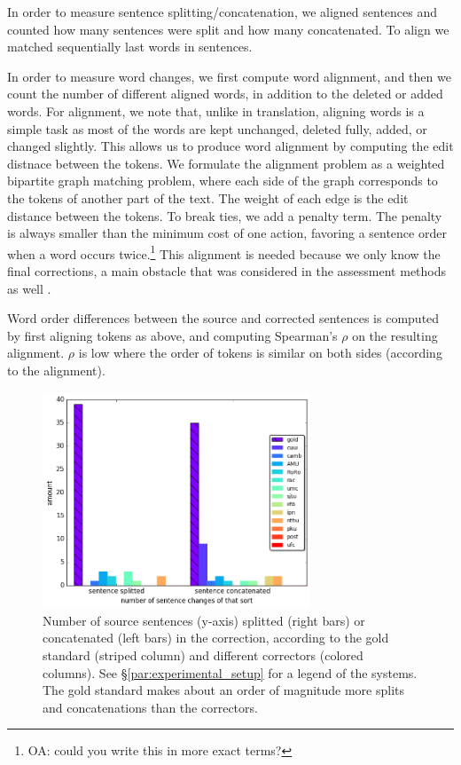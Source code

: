 \documentclass[english]{article}
\newcommand{\oa}[1]{\footnote{\color{red}OA: #1}}
\begin{document}
In order to measure sentence splitting/concatenation, we aligned sentences and counted how
many sentences were split and how many concatenated. To align we matched sequentially last
words in sentences.

In order to measure word changes, we first compute word alignment,
and then we count the number of different aligned words,
in addition to the deleted or added words.
For alignment, we note that, unlike in translation,
aligning words is a simple task as most of the words are kept unchanged,
deleted fully, added, or changed slightly. This allows us to
produce word alignment by computing the edit distnace between the tokens.
We formulate the alignment problem as a weighted bipartite graph matching problem,
where each side of the graph corresponds to the tokens of another part of the text.
The weight of each edge is the edit distance between the tokens.
To break ties, we add a penalty term. The penalty is always smaller than the minimum cost of
one action, favoring a sentence order when a word occurs twice.\oa{could you write this in
  more exact terms?} This alignment is needed because we only know the final corrections,
a main obstacle that was considered in the assessment methods as well
\cite{dahlmeier2012better}.

Word order differences between the source and corrected sentences is computed by first
aligning tokens as above, and computing Spearman's $\rho$ on the resulting alignment.
$\rho$ is low where the order of tokens is similar on both sides (according to the alignment).


\begin{figure}
	\includegraphics[width = 8cm]{aligned}
	\caption{Number of source sentences (y-axis) splitted (right bars) or concatenated (left bars) in the correction,
          according to
          the gold standard (striped column) and different correctors (colored columns). See \S\ref{par:experimental_setup} for a legend
          of the systems. The gold standard makes about an order of magnitude more splits and
          concatenations than the correctors.}
	\label{fig:split}
\end{figure}
\end{document}
